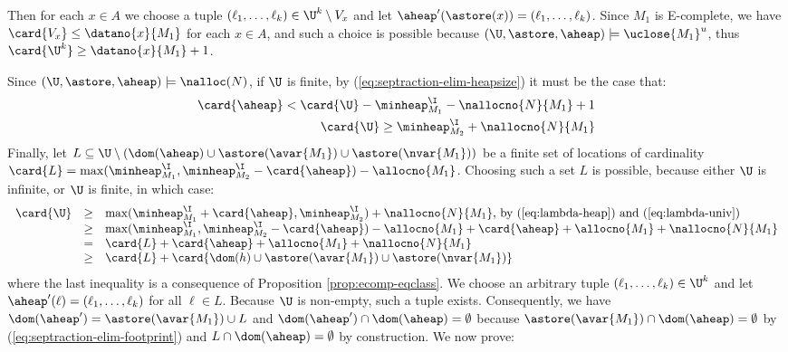 {  Then for each $x \in A$ we choose a tuple $(\ell_1,\ldots,\ell_k) \in
  \U^k \setminus V_x$ and let $\aheap'(\astore(x)) =
  (\ell_1,\ldots,\ell_k)$. Since $M_1$ is E-complete, we have $\card{V_x}
  \leq \datano{x}{M_1}$ for each $x \in A$, and such a choice is possible
  because $(\U,\astore,\aheap) \models \uclose{M_1}^u$, thus
  $\card{\U^k} \geq \datano{x}{M_1}+1$.

  Since $(\U,\astore,\aheap) \models \nalloc(N)$, if $\U$ is finite, by
  (\ref{eq:septraction-elim-heapsize}) it must be the case that:
  \begin{eqnarray}
    \card{\aheap} < \card{\U} - \minheap^{\I}_{M_1} - \nallocno{N}{M_1} + 1 \label{eq:lambda-heap} \\
    \card{\U} \geq \minheap^{\I}_{M_2} + \nallocno{N}{M_1} \label{eq:lambda-univ}
  \end{eqnarray}
  Finally, let $L \subseteq \U \setminus (\dom(\aheap) \cup
  \astore(\avar{M_1}) \cup \astore(\nvar{M_1}))$ be a finite set of
  locations of cardinality $\card{L} =
  \max(\minheap^\I_{M_1},\minheap^\I_{M_2} - \card{\aheap}) -
  \allocno{M_1}$. Choosing such a set $L$ is possible, because either $\U$
  is infinite, or $\U$ is finite, in which case:
  \[\begin{array}{rcl}
  \card{\U} & \geq & \max(\minheap^\I_{M_1} + \card{\aheap}, \minheap^\I_{M_2}) + \nallocno{N}{M_1} \text{, by (\ref{eq:lambda-heap}) and (\ref{eq:lambda-univ})} \\
  & \geq & \max(\minheap^\I_{M_1},\minheap^\I_{M_2} - \card{\aheap}) - \allocno{M_1} + \card{\aheap} + \allocno{M_1} + \nallocno{N}{M_1} \\ 
  & = & \card{L} +\card{\aheap} + \allocno{M_1} + \nallocno{N}{M_1}\\
  & \geq & \card{L} + \card{\dom(h) \cup \astore(\avar{M_1})\cup \astore(\nvar{M_1})}
  \end{array}\]
  where the last inequality is a consequence of Proposition
  \ref{prop:ecomp-eqclass}. We choose an arbitrary tuple
  $(\ell_1,\ldots,\ell_k) \in \U^k$ and let $\aheap'(\ell) =
  (\ell_1,\ldots,\ell_k)$ for all $\ell \in L$. Because $\U$ is
  non-empty, such a tuple exists. Consequently, we have $\dom(\aheap')
  = \astore(\avar{M_1}) \cup L$ and $\dom(\aheap') \cap \dom(\aheap) =
  \emptyset$ because $\astore(\avar{M_1}) \cap \dom(\aheap) =
  \emptyset$ by (\ref{eq:septraction-elim-footprint}) and $L \cap
  \dom(\aheap) = \emptyset$ by construction. We now prove:
  
}
